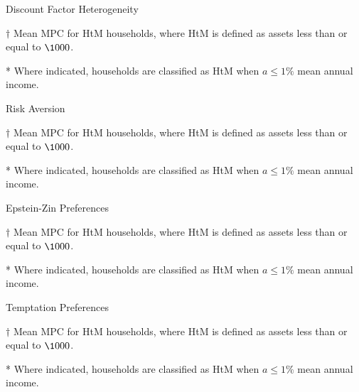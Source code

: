 \documentclass[9pt]{extarticle}
\begin{document}
\begin{table}[h]
\caption{Discount Factor Heterogeneity}
\begin{threeparttable}
\centering


\begin{tablenotes}
	\item[$\dagger$] Mean MPC for HtM households, where HtM is defined as assets less than or equal to $\1000$.
	\item[*] Where indicated, households are classified as HtM when $a \leq 1\%$ mean annual income.
\end{tablenotes}
\end{threeparttable}
\end{table}

\begin{table}[h]
\caption{Risk Aversion}
\begin{threeparttable}
\centering


\begin{tablenotes}
	\item[$\dagger$] Mean MPC for HtM households, where HtM is defined as assets less than or equal to $\1000$.
	\item[*] Where indicated, households are classified as HtM when $a \leq 1\%$ mean annual income.
\end{tablenotes}
\end{threeparttable}
\end{table}

\begin{table}[h]
\caption{Epstein-Zin Preferences}
\begin{threeparttable}
\centering


\begin{tablenotes}
	\item[$\dagger$] Mean MPC for HtM households, where HtM is defined as assets less than or equal to $\1000$.
	\item[*] Where indicated, households are classified as HtM when $a \leq 1\%$ mean annual income.
\end{tablenotes}
\end{threeparttable}
\end{table}

\begin{table}[h]
\caption{Temptation Preferences}
\begin{threeparttable}
\centering


\begin{tablenotes}
	\item[$\dagger$] Mean MPC for HtM households, where HtM is defined as assets less than or equal to $\1000$.
	\item[*] Where indicated, households are classified as HtM when $a \leq 1\%$ mean annual income.
\end{tablenotes}
\end{threeparttable}
\end{table}
\end{document}
